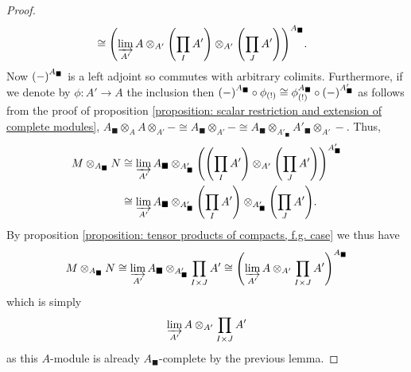 \begin{proof}
\begin{align*}
		&\cong \completion{\colimit_{A'} A\otimes_{A'}\mleft(\prod_I A'\mright)\otimes_{A'}\mleft(\prod_J A'\mright)}{A_\blacksquare}.
	\end{align*}
	Now $\completion{-}{A_\blacksquare}$ is a left adjoint so commutes with arbitrary colimits. Furthermore, if we denote by $\phi\colon A'\to A$ the inclusion then $\completion{-}{A_\blacksquare} \circ \scalarExtension{\phi} \cong \completedScalarExtension{\phi}{A_\blacksquare} \circ \completion{-}{A'_\blacksquare}$ as follows from the proof of proposition \ref{proposition: scalar restriction and extension of complete modules}, \ie $A_\blacksquare \otimes_{A} A\otimes_{A'} - \cong A_\blacksquare\otimes_{A'} - \cong A_\blacksquare\otimes_{A'_\blacksquare} A'_\blacksquare\otimes_{A'} -$. Thus,
	\begin{align*}
		M\otimes_{A_\blacksquare} N &\cong \colimit_{A'} A_\blacksquare\otimes_{A'_\blacksquare}\completion{\mleft(\prod_I A'\mright)\otimes_{A'}\mleft(\prod_J A'\mright)}{A'_\blacksquare}\\
		 &\cong \colimit_{A'} A_\blacksquare\otimes_{A'_\blacksquare}\mleft(\prod_I A'\mright)\otimes_{A'_\blacksquare}\mleft(\prod_J A'\mright).
	\end{align*}
	By proposition \ref{proposition: tensor products of compacts, f.g. case} we thus have
		$$M\otimes_{A_\blacksquare} N \cong \colimit_{A'} A_\blacksquare\otimes_{A'_\blacksquare} \prod_{I\times J} A' \cong \completion{\colimit_{A'} A\otimes_{A'}\prod_{I\times J} A'}{A_\blacksquare}$$
	which is simply
		$$\varinjlim_{A'} A\otimes_{A'} \prod_{I\times J} A'$$
	as this $A$-module is already $A_\blacksquare$-complete by the previous lemma.
\end{proof}

